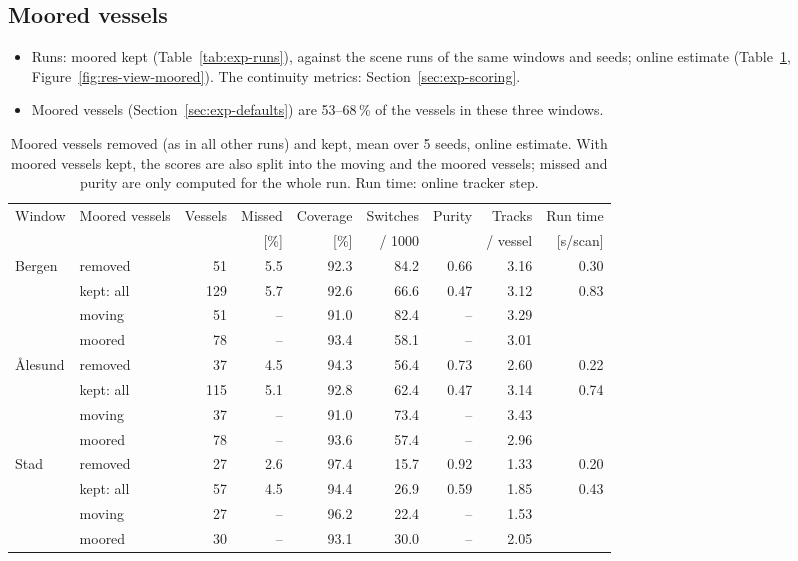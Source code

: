 \subsection{Moored vessels}
\label{sec:res-moored}

\begin{itemize}
    \item Runs: moored kept (Table~\ref{tab:exp-runs}), against the scene runs of the same windows and seeds; online estimate (Table~\ref{tab:res-moored}, Figure~\ref{fig:res-view-moored}). The continuity metrics: Section~\ref{sec:exp-scoring}.
    \item Moored vessels (Section~\ref{sec:exp-defaults}) are 53--68\,\% of the vessels in these three windows.
\end{itemize}

\begin{table}[htbp]
\centering
\caption{Moored vessels removed (as in all other runs) and kept, mean over 5 seeds, online estimate. With moored vessels kept, the scores are also split into the moving and the moored vessels; missed and purity are only computed for the whole run. Run time: online tracker step.}
\label{tab:res-moored}
\small
\begin{tabular}{l l r r r r r r r}
\toprule
Window & Moored vessels & Vessels & Missed & Coverage & Switches & Purity & Tracks & Run time \\
 & & & [\%] & [\%] & / 1000 & & / vessel & [s/scan] \\
\midrule
Bergen & removed & 51 & 5.5 & 92.3 & 84.2 & 0.66 & 3.16 & 0.30 \\
 & kept: all & 129 & 5.7 & 92.6 & 66.6 & 0.47 & 3.12 & 0.83 \\
 & \quad moving & 51 & -- & 91.0 & 82.4 & -- & 3.29 & \\
 & \quad moored & 78 & -- & 93.4 & 58.1 & -- & 3.01 & \\
\addlinespace
Ålesund & removed & 37 & 4.5 & 94.3 & 56.4 & 0.73 & 2.60 & 0.22 \\
 & kept: all & 115 & 5.1 & 92.8 & 62.4 & 0.47 & 3.14 & 0.74 \\
 & \quad moving & 37 & -- & 91.0 & 73.4 & -- & 3.43 & \\
 & \quad moored & 78 & -- & 93.6 & 57.4 & -- & 2.96 & \\
\addlinespace
Stad & removed & 27 & 2.6 & 97.4 & 15.7 & 0.92 & 1.33 & 0.20 \\
 & kept: all & 57 & 4.5 & 94.4 & 26.9 & 0.59 & 1.85 & 0.43 \\
 & \quad moving & 27 & -- & 96.2 & 22.4 & -- & 1.53 & \\
 & \quad moored & 30 & -- & 93.1 & 30.0 & -- & 2.05 & \\
\bottomrule
\end{tabular}
\end{table}


